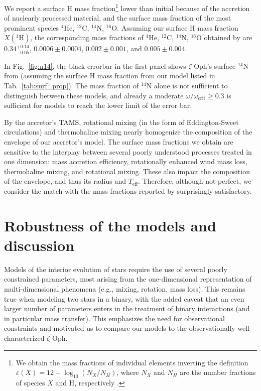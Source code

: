 \documentclass[twocolumn,twocolappendix,trackchanges]{aastex63}
\DeclareRobustCommand{\Figref}[1]{Fig.~\ref{#1}}
\DeclareRobustCommand{\Tabref}[1]{Tab.~\ref{#1}}
\newcommand{\zoph}{$\zeta$ Oph}
\begin{document}
We report a surface H mass fraction\footnote{We obtain the mass
  fractions of individual elements inverting the definition
  $\varepsilon(X)=12+\log_{10}(N_X/N_H)$, where $N_X$ and $N_H$ are
  the number fractions of species $X$ and H, respectively
  \citep[e.g.,][]{lodders:19}.} lower than initial because of the
accretion of nuclearly processed material, and the surface mass
fraction of the most prominent species $^4\mathrm{He}$,
$^{12}\mathrm{C}$, $^{14}\mathrm{N}$, $^{16}\mathrm{O}$.  Assuming our
surface H mass fraction $X(^1\mathrm{H})$, the corresponding mass
fractions of $^4\mathrm{He}$, $^{12}\mathrm{C}$, $^{14}\mathrm{N}$,
$^{16}\mathrm{O}$ obtained by  are
$0.34^{+0.14}_{-0.05}$, $0.0006\pm0.0004$, $0.002\pm0.001$, and
$0.005\pm0.004$.

In \Figref{fig:n14}, the black errorbar in the first panel shows
\zoph's surface $^{14}\mathrm{N}$ from 
(assuming the surface H mass fraction from our model listed in
\Tabref{tab:surf_prop}). The mass fraction of $^{14}\mathrm{N}$ alone
is not sufficient to distinguish between these models, and already a
moderate $\omega/\omega_\mathrm{crit}\geq0.3$ is sufficient for models
to reach the lower limit of the error bar.


By the accretor's TAMS, rotational mixing (in the
form of Eddington-Sweet circulations) and thermohaline mixing nearly
homogenize the composition of the envelope of our accretor's
model. The surface mass fractions we obtain are sensitive to the
interplay between several poorly understood processes treated in one
dimension: mass accretion efficiency, rotationally enhanced wind mass
loss, thermohaline mixing, and rotational mixing. These also impact
the composition of the envelope, and thus its radius and
$T_\mathrm{eff}$. Therefore, although not perfect, we consider the
match with the mass fractions reported by 
surprisingly satisfactory.


\section{Robustness of the models and discussion}
\label{sec:discussion}

Models of the interior evolution of stars require the use of several
poorly constrained parameters, most arising from the one-dimensional
representation of multi-dimensional phenomena (e.g., mixing,
rotation, mass loss). This remains true when modeling two stars in a
binary, with the added caveat that an even larger number of parameters
enters in the treatment of binary interactions (and in particular mass
transfer). This emphasizes the need for observational constraints and
motivated us to compare our models to the observationally well
characterized \zoph.
\end{document}
